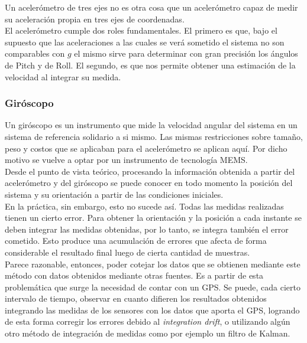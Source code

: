 \documentclass[main]{subfiles}
\begin{document}
Un aceler\'ometro de tres ejes no es otra cosa que un aceler\'ometro capaz de medir su aceleraci\'on propia en tres ejes de coordenadas.\\


El aceler\'ometro cumple dos roles fundamentales. El primero es que, bajo el supuesto que las aceleraciones a las cuales se ver\'a sometido el sistema no son comparables con $g$ el mismo sirve para determinar con gran precisi\'on los \'angulos de Pitch y de Roll. El segundo, es que nos permite obtener una estimaci\'on de la velocidad al integrar su medida.  
 
\subsubsection{Gir\'oscopo}
\label{giro}

Un gir\'oscopo es un instrumento que mide la velocidad angular del sistema en un sistema de referencia solidario a si mismo. Las mismas restricciones sobre tama\~no, peso y costos que se aplicaban para el aceler\'ometro se aplican aqu\'i. Por dicho motivo se vuelve a optar por un instrumento de tecnolog\'ia MEMS.\\ 

Desde el punto de vista te\'orico, procesando la informaci\'on obtenida a partir del aceler\'ometro y del gir\'oscopo se puede conocer en todo momento la posici\'on del sistema y su orientaci\'on a partir de las condiciones iniciales.\\

En la pr\'actica, sin embargo, esto no sucede as\'i. Todas las medidas realizadas tienen un cierto error. Para obtener la orientaci\'on y la posici\'on a cada instante se deben integrar las medidas obtenidas, por lo tanto, se integra tambi\'en el error cometido. Esto produce una acumulaci\'on de errores que afecta de forma considerable el resultado final luego de cierta cantidad de muestras.\\
Parece razonable, entonces, poder cotejar los datos que se obtienen mediante este m\'etodo con datos obtenidos mediante otras fuentes. Es a partir de esta problem\'atica que surge la necesidad de contar con un GPS. Se puede, cada cierto intervalo de tiempo, observar en cuanto difieren los resultados obtenidos integrando las medidas de los sensores con los datos que aporta el GPS, logrando de esta forma corregir los errores debido al \emph{integration drift}, o utilizando alg\'un otro m\'etodo de integraci\'on de medidas como por ejemplo un filtro de Kalman.
\end{document}
